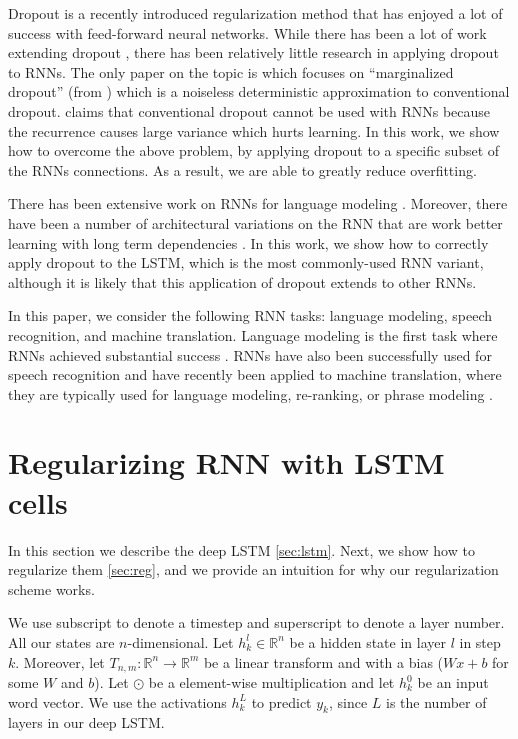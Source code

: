\documentclass{article}
\begin{document}
Dropout \cite{srivastava2013improving} is a recently introduced
regularization method that has enjoyed a lot of success with
feed-forward neural networks.  While there has been a lot of work
extending dropout \cite{wang2013fast,wan2013regularization}, there has
been relatively little research in applying dropout to RNNs. The only
paper on the topic is \citet{bayer2013fast} which focuses on
``marginalized dropout'' (from \citet{wang2013fast}) which is a
noiseless deterministic approximation to conventional dropout.
\citet{bayer2013fast} claims that conventional dropout cannot be used
with RNNs because the recurrence causes large variance which hurts
learning. In this work, we show how to overcome the above problem, by
applying dropout to a specific subset of the RNNs connections.  As a
result, we are able to greatly reduce overfitting.

There has been extensive work on RNNs for language modeling
\cite{mikolov2012statistical, sutskever2013training}. Moreover, there
have been a number of architectural variations on the RNN that are
work better learning with long term dependencies
\cite{hochreiter1997long, graves2009novel, cho2014learning,
  jaeger2007optimization, koutnik2014clockwork}.  In this work, we
show how to correctly apply dropout to the LSTM, which is the most
commonly-used RNN variant,  although it is likely that this application
of dropout extends to other RNNs.

In this paper, we consider the following RNN tasks: language modeling,
speech recognition, and machine translation.  Language modeling is the
first task where RNNs achieved substantial success
\cite{mikolov2010recurrent, mikolov2011strategies,
  pascanu2013construct}.  RNNs have also been successfully used for
speech recognition \cite{robinson1996use, graves2013speech} and have
recently been applied to machine translation, where they are typically
used for language modeling, re-ranking, or phrase modeling
\cite{cho2014learning,chow1987byblos,mikolov2013exploiting}.

\section{Regularizing RNN with LSTM cells}

In this section we describe the deep LSTM \ref{sec:lstm}. Next, 
we show how to regularize them \ref{sec:reg}, and we provide an intuition
for why our regularization scheme works.

We use subscript to denote a timestep and superscript to denote 
a layer number.  All our states are $n$-dimensional.  Let $h^l_k
\in \mathbb{R}^{n}$ be a hidden state in layer $l$ in step
$k$. Moreover, let $T_{n,m}:\mathbb{R}^{n} \rightarrow \mathbb{R}^{m}$
be a linear transform and with a bias ($Wx + b$ for some $W$ and $b$).
Let $\odot$ be a element-wise multiplication and let $h^0_k$ be an
input word vector.  We use the activations $h^{L}_k$ to predict $y_k$,
since $L$ is the number of layers in our deep LSTM.
\end{document}
